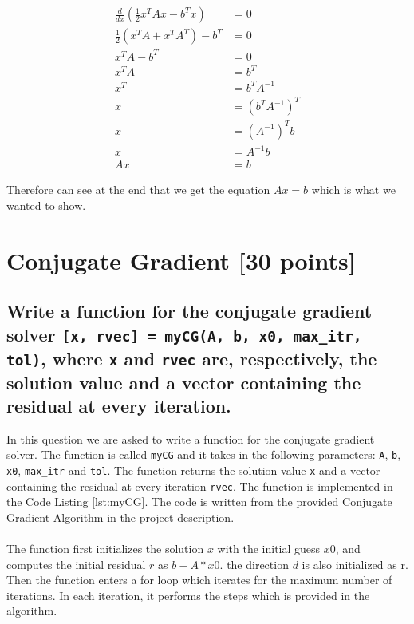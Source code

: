 \documentclass[unicode,11pt,a4paper,oneside,numbers=endperiod,openany]{scrartcl}
\begin{document}
\begin{align}
    \frac{d}{dx} \left( \frac{1}{2} x^T Ax - b^Tx \right) & = 0                           \\
    \frac{1}{2} \left( x^T A + x^T A^T \right) - b^T      & = 0                           \\
    x^T A - b^T                                           & = 0                           \\
    x^T A                                                 & = b^T                         \\
    x^T                                                   & = b^T A^{-1}                  \\
    x                                                     & = \left( b^T A^{-1} \right)^T \\
    x                                                     & = \left( A^{-1} \right)^T b   \\
    x                                                     & = A^{-1} b                    \\
    Ax                                                    & = b
\end{align}

Therefore can see at the end that we get the equation $Ax = b$ which is what we wanted to show.

\section{Conjugate Gradient [30 points]}


\subsection{Write a function for the conjugate gradient solver \texttt{[x, rvec] = myCG(A, b, x0, max\_itr, tol)}, where \texttt{x} and \texttt{rvec} are, respectively, the solution value and a vector containing the residual at every iteration.}

In this question we are asked to write a function for the conjugate gradient solver. The function is called \texttt{myCG} and it takes in the following parameters: \texttt{A}, \texttt{b}, \texttt{x0}, \texttt{max\_itr} and \texttt{tol}. The function returns the solution value \texttt{x} and a vector containing the residual at every iteration \texttt{rvec}. The function is implemented in the Code Listing \ref{lst:myCG}. The code is written from the provided Conjugate Gradient Algorithm in the project description.
\\
\\
The function first initializes the solution $x$ with the initial guess $x0$, and computes the initial residual $r$ as $b - A * x0$. the direction $d$ is also initialized as r. Then the function enters a for loop which iterates for the maximum number of iterations. In each iteration, it performs the steps which is provided in the algorithm.
\end{document}
